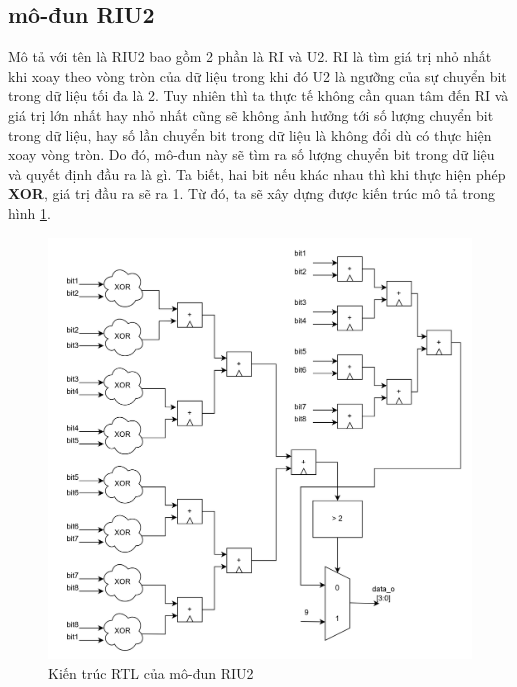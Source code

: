\subsection{mô-đun RIU2}
Mô tả với tên là RIU2 bao gồm 2 phần là RI và U2. RI là tìm giá trị nhỏ nhất khi xoay theo vòng tròn của dữ liệu trong khi đó U2 là ngưỡng của sự chuyển bit trong dữ liệu tối đa là 2. Tuy nhiên thì ta thực tế không cần quan tâm đến RI và giá trị lớn nhất hay nhỏ nhất cũng sẽ không ảnh hưởng tới số lượng chuyển bit trong dữ liệu, hay số lần chuyển bit trong dữ liệu là không đổi dù có thực hiện xoay vòng tròn. Do đó, mô-đun này sẽ tìm ra số lượng chuyển bit trong dữ liệu và quyết định đầu ra là gì. Ta biết, hai bit nếu khác nhau thì khi thực hiện phép \textbf{XOR}, giá trị đầu ra sẽ ra 1. Từ đó, ta sẽ xây dựng được kiến trúc mô tả trong hình \ref{fig:riu2RTL}.
\begin{figure}[!ht]
	\centering
	\includegraphics[width=1\linewidth]{figures/riu2RTL.png}
	\caption{Kiến trúc RTL của mô-đun RIU2}
	\label{fig:riu2RTL}
\end{figure}

